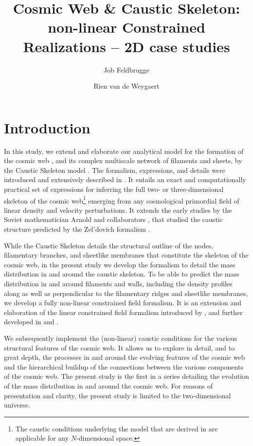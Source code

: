 \documentclass[a4paper, 11pt]{article}
\title{Cosmic Web \& Caustic Skeleton: non-linear Constrained Realizations -- 2D case studies}
\author[a]{Job Feldbrugge}
\author[b]{Rien van de Weygaert}
\affiliation[a]{Higgs Centre for Theoretical Physics, University of Edinburgh, Edinburgh, Scotland, EH8 9YL}
\affiliation[b]{Kapteyn Astronomical Institute, University of Groningen, Groningen, The Netherlands}
\begin{document}
\maketitle


\section{Introduction}
In this study, we extend and elaborate our analytical model for the formation of the cosmic web \cite{Zeldovich:1970,Bond:1996,Weygaert:2008}, and its complex multiscale network of filaments and sheets, by the Caustic Skeleton model \cite{Feldbrugge:2018}. The formalism, expressions, and details were introduced and extensively described in \cite{Feldbrugge:2018}. It entails an exact and computationally practical set of expressions for inferring the full two- or three-dimensional skeleton of the cosmic web\footnote{The caustic conditions underlying the model that are derived in \cite{Feldbrugge:2018} are applicable for any $N$-dimensional space.} emerging from any cosmological primordial field of linear density and velocity perturbations. It extends the early studies by the Soviet mathematician Arnold and collaborators \cite{Arnold:1982a,Arnold:1982b}, that studied the caustic structure predicted by the Zel'dovich formalism \cite{Zeldovich:1970}.

While the Caustic Skeleton details the structural outline of the nodes, filamentary branches, and sheetlike membranes that constitute the skeleton of the cosmic web, in the present study we develop the formalism to detail the mass distribution in and around the caustic skeleton. To be able to predict the mass distribution in and around filaments and walls, including the density profiles along as well as perpendicular to the filamentary ridges and sheetlike membranes, we develop a fully non-linear constrained field formalism. It is an extension and elaboration of the linear constrained field formalism introduced by \cite{Bertschinger:1987}, and further developed in \cite{Hoffman:1991} and \cite{Weygaert:1996}.

We subsequently implement the (non-linear) caustic conditions for the various structural features of the cosmic web. It allows us to explore in detail, and to great depth, the processes in and around the evolving features of the cosmic web and the hierarchical buildup of the connections between the various components of the cosmic web. The present study is the first in a series detailing the evolution of the mass distribution in and around the cosmic web. For reasons of presentation and clarity, the present study is limited to the two-dimensional universe. 
\end{document}
